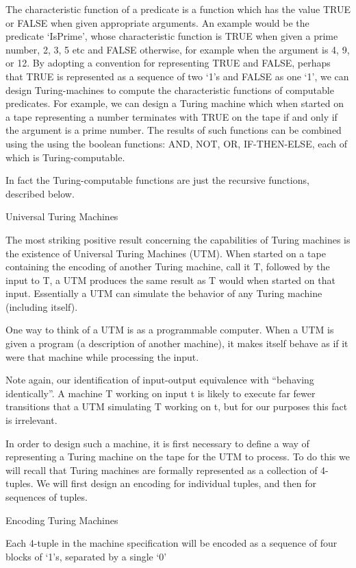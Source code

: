 The characteristic function of a predicate is a function which has the value TRUE or FALSE when given appropriate arguments. An example would be the predicate ‘IsPrime’, whose characteristic function is TRUE when given a prime number, 2, 3, 5 etc and FALSE otherwise, for example when the argument is 4, 9, or 12. By adopting a convention for representing TRUE and FALSE, perhaps that TRUE is represented as a sequence of two ‘1’s and FALSE as one ‘1’, we can design Turing-machines to compute the characteristic functions of computable predicates. For example, we can design a Turing machine which when started on a tape representing a number terminates with TRUE on the tape if and only if the argument is a prime number. The results of such functions can be combined using the using the boolean functions: AND, NOT, OR, IF-THEN-ELSE, each of which is Turing-computable.

In fact the Turing-computable functions are just the recursive functions, described below.

Universal Turing Machines

The most striking positive result concerning the capabilities of Turing machines is the existence of Universal Turing Machines (UTM). When started on a tape containing the encoding of another Turing machine, call it T, followed by the input to T, a UTM produces the same result as T would when started on that input. Essentially a UTM can simulate the behavior of any Turing machine (including itself).

One way to think of a UTM is as a programmable computer. When a UTM is given a program (a description of another machine), it makes itself behave as if it were that machine while processing the input.

Note again, our identification of input-output equivalence with “behaving identically”. A machine T working on input t is likely to execute far fewer transitions that a UTM simulating T working on t, but for our purposes this fact is irrelevant.

In order to design such a machine, it is first necessary to define a way of representing a Turing machine on the tape for the UTM to process. To do this we will recall that Turing machines are formally represented as a collection of 4-tuples. We will first design an encoding for individual tuples, and then for sequences of tuples.

Encoding Turing Machines

Each 4-tuple in the machine specification will be encoded as a sequence of four blocks of ‘1’s, separated by a single ‘0’

